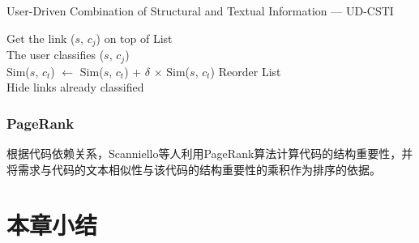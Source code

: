 \begin{algorithm}[htbp]
\caption{User-Driven Combination of Structural and Textual Information — UD-CSTI}
\label{alg:UD_CSTI}
    {
      Get the link ($s$, $c_{j}$) on top of List\\
      The user classifies ($s$, $c_{j}$)\\
       {
           {
             {
              Sim($s$, $c_{t}$) $\leftarrow$ Sim($s$, $c_{t}$) + $\delta$ $\times$ Sim($s$, $c_{t}$)
            }
          }
       }
      Reorder List\\
      Hide links already classified
    }
\end{algorithm}

\subsubsection{PageRank}
根据代码依赖关系，Scanniello等人\cite{scanniello2015link}利用PageRank算法计算代码的结构重要性，并将需求与代码的文本相似性与该代码的结构重要性的乘积作为排序的依据。

\section{本章小结}


